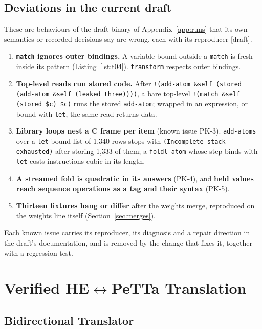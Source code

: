 \documentclass[11pt]{article}
\newcommand{\code}[1]{\texttt{#1}}
\newcommand{\kind}[1]{\textsf{\small[#1]}}
\newcommand{\PeTTa}{\textup{PeTTa}}
\newcommand{\HE}{\textup{HE}}
\begin{document}
\subsection{Deviations in the current draft}
\label{sec:prime-draft}

These are behaviours of the draft binary of Appendix~\ref{app:runs} that its
own semantics or recorded decisions say are wrong, each with its reproducer
\kind{draft}.

\begin{enumerate}
\item \textbf{\code{match} ignores outer bindings.}  A variable bound outside
  a \code{match} is fresh inside its pattern (Listing~\ref{lst:t04}).
  \code{transform} respects outer bindings.
\item \textbf{Top-level reads run stored code.}  After
  \code{!(add-atom \&self (stored (add-atom \&self (leaked three))))}, a bare
  top-level \code{!(match \&self (stored \$c) \$c)} runs the stored
  \code{add-atom}; wrapped in an expression, or bound with \code{let}, the same
  read returns data.
\item \textbf{Library loops nest a C frame per item} (known issue PK-3).
  \code{add-atoms} over a \code{let}-bound list of 1{,}340 rows stops with
  \code{(Incomplete stack-exhausted)} after storing 1{,}333 of them; a
  \code{foldl-atom} whose step binds with \code{let} costs instructions cubic
  in its length.
\item \textbf{A streamed fold is quadratic in its answers} (PK-4), and
  \textbf{held values reach sequence operations as a tag and their syntax}
  (PK-5).
\item \textbf{Thirteen fixtures hang or differ} after the weights merge,
  reproduced on the weights line itself (Section~\ref{sec:merges}).
\end{enumerate}

\noindent
Each known issue carries its reproducer, its diagnosis and a repair direction
in the draft's documentation, and is removed by the change that fixes it,
together with a regression test.

\section{Verified \HE{}$\leftrightarrow$\PeTTa{} Translation}

\subsection{Bidirectional Translator}
\end{document}
